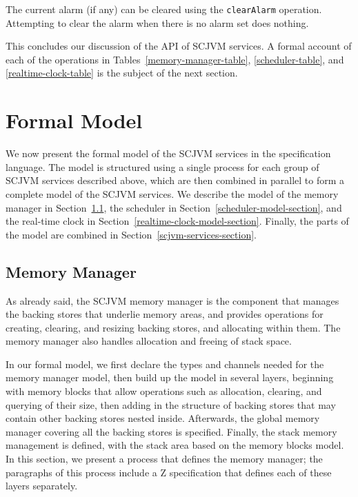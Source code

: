 The current alarm (if any) can be cleared using the
\texttt{clear\-Alarm} operation.
Attempting to clear the alarm when there is no alarm set does nothing.

This concludes our discussion of the API of SCJVM services.
A formal account of each of the operations in
Tables~\ref{memory-manager-table}, \ref{scheduler-table}, and
\ref{realtime-clock-table} is the subject of the next section. 

\section{Formal Model}
\label{formal-model-section}

We now present the formal model of the SCJVM services in the \Circus{}
specification language.
The model is structured using a single process for each group of SCJVM
services described above, which are then combined in parallel to form
a complete model of the SCJVM services.
We describe the model of the memory manager in
Section~\ref{memory-manager-model-section}, the scheduler in
Section~\ref{scheduler-model-section}, and the real-time clock in
Section~\ref{realtime-clock-model-section}.
Finally, the parts of the model are combined in
Section~\ref{scjvm-services-section}.


\subsection{Memory Manager}
\label{memory-manager-model-section}

As already said, the SCJVM memory manager is the component that
manages the backing stores that underlie memory areas, and provides
operations for creating, clearing, and resizing backing stores, and
allocating within them.
The memory manager also handles allocation and freeing of stack space.

In our formal model, we first declare the types and channels needed
for the memory manager model, then build up the model in several
layers, beginning with memory blocks that allow operations such as
allocation, clearing, and querying of their size, then adding in the
structure of backing stores that may contain other backing stores
nested inside.
Afterwards, the global memory manager covering all the backing stores
is specified.
Finally, the stack memory management is defined, with the stack area
based on the memory blocks model.
In this section, we present a \Circus{} process that defines the
memory manager; the paragraphs of this process include a Z
specification that defines each of these layers separately.

